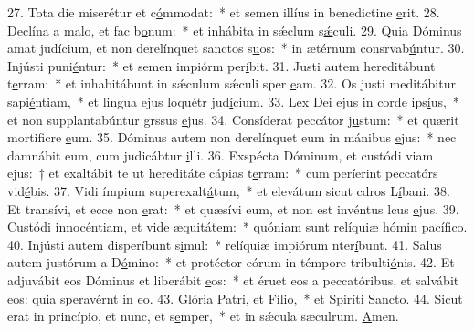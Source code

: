 27. Tota die miserétur et c\uline{ó}mmodat:~* et semen illíus in benedictine \uline{e}rit.
28. Declína a malo, et fac b\uline{o}num:~* et inhábita in sǽclum s\uline{ǽ}culi.
29. Quia Dóminus amat judícium, et non derelínquet sanctos s\uline{u}os:~* in ætérnum consrvab\uline{ú}ntur.
30. Injústi puni\uline{é}ntur:~* et semen impiórm per\uline{í}bit.
31. Justi autem hereditábunt t\uline{e}rram:~* et inhabitábunt in sǽculum sǽculi sper \uline{e}am.
32. Os justi meditábitur sapi\uline{é}ntiam,~* et lingua ejus loquétr jud\uline{í}cium.
33. Lex Dei ejus in corde ips\uline{í}us,~* et non supplantabúntur grssus \uline{e}jus.
34. Consíderat peccátor j\uline{u}stum:~* et quærit mortificre \uline{e}um.
35. Dóminus autem non derelínquet eum in mánibus \uline{e}jus:~* nec damnábit eum, cum judicábtur \uline{i}lli.
36. Exspécta Dóminum, et custódi viam ejus:~† et exaltábit te ut hereditáte cápias t\uline{e}rram:~* cum períerint peccatórs vid\uline{é}bis.
37. Vidi ímpium superexalt\uline{á}tum,~* et elevátum sicut cdros L\uline{í}bani.
38. Et transívi, et ecce non \uline{e}rat:~* et quæsívi eum, et non est invéntus lcus \uline{e}jus.
39. Custódi innocéntiam, et vide æquit\uline{á}tem:~* quóniam sunt relíquiæ hómin pac\uline{í}fico.
40. Injústi autem disperíbunt s\uline{i}mul:~* relíquiæ impiórum nter\uline{í}bunt.
41. Salus autem justórum a D\uline{ó}mino:~* et protéctor eórum in témpore tribulti\uline{ó}nis.
42. Et adjuvábit eos Dóminus et liberábit \uline{e}os:~* et éruet eos a peccatóribus, et salvábit eos: quia speravérnt in \uline{e}o.
43. Glória Patri, et F\uline{í}lio,~* et Spiríti S\uline{a}ncto.
44. Sicut erat in princípio, et nunc, et s\uline{e}mper,~* et in sǽcula sæculrum. \uline{A}men.
